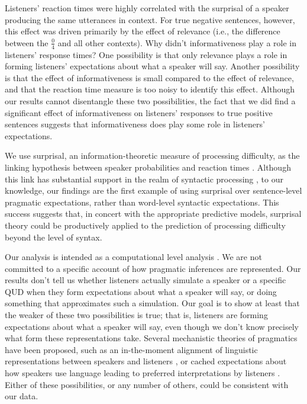 \documentclass[man, floatsintext, noapacite]{apa6}
\begin{document}

Listeners' reaction times were highly correlated with the surprisal of a speaker producing the same utterances in context. For true negative sentences, however, this effect was driven primarily by the effect of relevance (i.e., the difference between the $\frac{0}{4}$ and all other contexts). Why didn't informativeness play a role in listeners' response times? One possibility is that only relevance plays a role in forming listeners' expectations about what a speaker will say. Another possibility is that the effect of informativeness is small compared to the effect of relevance, and that the reaction time measure is too noisy to identify this effect. Although our results cannot disentangle these two possibilities, the fact that we did find a significant effect of informativeness on listeners' responses to true positive sentences suggests that informativeness does play some role in listeners' expectations. 

We use surprisal, an information-theoretic measure of processing difficulty, as the linking hypothesis between speaker probabilities and reaction times \cite{levy2008}. Although this link has substantial support in the realm of syntactic processing \cite{demberg2008,boston2008}, to our knowledge, our findings are the first example of using surprisal over sentence-level pragmatic expectations, rather than word-level syntactic expectations. This success suggests that, in concert with the appropriate predictive models, surprisal theory could be productively applied to the prediction of processing difficulty beyond the level of syntax. 

Our analysis is intended as a computational level analysis \cite{marr1982}. We are not committed to a specific account of how pragmatic inferences are represented. Our results don't tell us whether listeners actually simulate a speaker or a specific QUD when they form expectations about what a speaker will say, or doing something that approximates such a simulation. Our goal is to show at least that the weaker of these two possibilities is true; that is, listeners are forming expectations about what a speaker will say, even though we don't know precisely what form these representations take. Several mechanistic theories of pragmatics have been proposed, such as an in-the-moment alignment of linguistic representations between speakers and listeners \cite{pickering2004}, or cached expectations about how speakers use language leading to preferred interpretations by listeners \cite{levinson2000}. Either of these possibilities, or any number of others, could be consistent with our data. 
\end{document}
